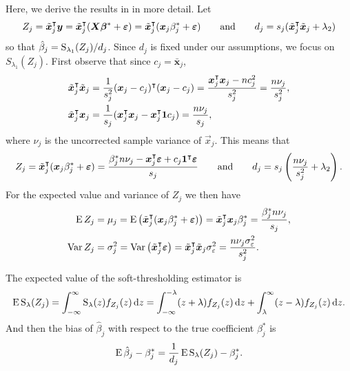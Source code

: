 Here, we derive the results in  in more detail. Let
\[
  {Z_j} = \tilde{\bm{x}}_j^\intercal \bm{y} = \tilde{\bm{x}}_j^\intercal(\bm{X}\bm{\beta}^* + \bm{\varepsilon}) = \tilde{\bm{x}}_j^\intercal (\bm{x}_j\beta_j^* + \boldsymbol{\varepsilon})
  \qquad
  \text{and}
  \qquad
  d_j = s_j(\tilde{\bm{x}}_j^\intercal \tilde{\bm{x}}_j + \lambda_2)
\]
so that \(\hat{\beta}_j = \operatorname{S}_{\lambda_1}({Z_j})/d_j\). Since \(d_j\) is fixed under our
assumptions, we focus on \(S_{\lambda_1}({Z_j})\). First observe that since \(c_j =
\bar{\bm{x}}_j\),
\[
  \begin{aligned}
    \tilde{\bm{x}}_j^\intercal \tilde{\bm{x}}_j & = \frac{1}{s_j^2}(\bm{x}_j - c_j)^\intercal (\bm{x}_j - c_j) = \frac{\bm{x}_j^\intercal\bm{x}_j - nc_j^2}{s^2_j} = \frac{n \nu_j}{s_j^2}, \\
    \tilde{\bm{x}}_j^\intercal \bm{x}_j         & = \frac{1}{s_j}(\bm{x}_j^\intercal \bm{x}_j - \bm{x}_j^\intercal \bm{1} c_j) = \frac{n \nu_j}{s_j},
  \end{aligned}
\]
where \(\nu_j\) is the uncorrected sample variance of \(\vec{x}_j\). This means that
\begin{equation}
  {Z_j} = \tilde{\bm{x}}_j^\intercal (\bm{x}_j\beta_j^* + \boldsymbol{\varepsilon}) = \frac{\beta_j^* n \nu_j- \bm{x}_j^\intercal \bm{\varepsilon} + c_j \bm{1}^\intercal \bm{\varepsilon}}{s_j}
  \qquad\text{and}\qquad
  d_j = s_j\left(\frac{n \nu_j}{s_j^2} + \lambda_2\right).
\end{equation}
For the expected value and variance of \({Z_j}\) we then have
\begin{align*}
  \operatorname{E} {Z_j}   & = \mu_j = \operatorname{E} \left( \tilde{\bm{x}}_j^\intercal (\bm{x}_j\beta^*_j + \bm{\varepsilon}) \right)  = \tilde{\bm{x}}_j^\intercal\bm{x}_j \beta^*_j = \frac{\beta_j^* n \nu_j}{s_j},            \\
  \operatorname{Var} {Z_j} & = \sigma_j^2 = \operatorname{Var}\left(\tilde{\bm{x}}_j ^\intercal \bm{\varepsilon}\right) = \tilde{\bm{x}}_j^\intercal \tilde{\bm{x}}_j\sigma_\varepsilon^2 = \frac{n\nu_j\sigma_\varepsilon^2}{s_j^2}.
\end{align*}

The expected value of the soft-thresholding estimator is
\begin{equation*}
  \operatorname{E} \operatorname{S}_\lambda({Z_j}) = \int_{-\infty}^\infty \operatorname{S}_\lambda(z) f_{Z_j}(z) \mathop{}\!\mathrm{d} z
  = \int_{-\infty}^{-\lambda}(z + \lambda)f_{Z_j}(z) \mathop{}\!\mathrm{d} z + \int_{\lambda}^\infty (z - \lambda)f_{Z_j}(z) \mathop{}\!\mathrm{d} z.
\end{equation*}
And then the bias of \(\hat\beta_j\) with respect to the true coefficient \(\beta_j^*\) is
\begin{equation*}
  \operatorname{E} \hat\beta_j - \beta_j^* = \frac{1}{d_j}\operatorname{E} \operatorname{S}_\lambda({Z_j}) - \beta^*_j.
\end{equation*}

